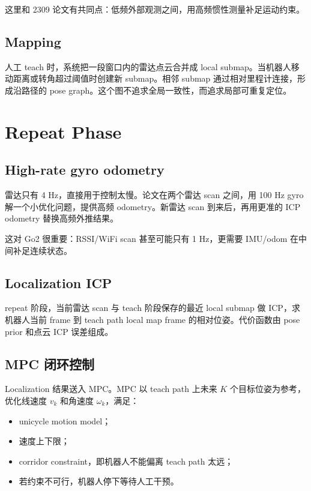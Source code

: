 \documentclass[UTF8,a4paper,12pt]{ctexrep}
\begin{document}
这里和 2309 论文有共同点：低频外部观测之间，用高频惯性测量补足运动约束。

\subsection{Mapping}

人工 teach 时，系统把一段窗口内的雷达点云合并成 local submap。当机器人移动距离或转角超过阈值时创建新 submap。相邻 submap 通过相对里程计连接，形成沿路径的 pose graph。这个图不追求全局一致性，而追求局部可重复定位。

\section{Repeat Phase}

\subsection{High-rate gyro odometry}

雷达只有 4 Hz，直接用于控制太慢。论文在两个雷达 scan 之间，用 100 Hz gyro 解一个小优化问题，提供高频 odometry。新雷达 scan 到来后，再用更准的 ICP odometry 替换高频外推结果。

这对 Go2 很重要：RSSI/WiFi scan 甚至可能只有 1 Hz，更需要 IMU/odom 在中间补足连续状态。

\subsection{Localization ICP}

repeat 阶段，当前雷达 scan 与 teach 阶段保存的最近 local submap 做 ICP，求机器人当前 frame 到 teach path local map frame 的相对位姿。代价函数由 pose prior 和点云 ICP 误差组成。

\subsection{MPC 闭环控制}

Localization 结果送入 MPC。MPC 以 teach path 上未来 \(K\) 个目标位姿为参考，优化线速度 \(v_k\) 和角速度 \(\omega_k\)，满足：

\begin{itemize}
  \item unicycle motion model；
  \item 速度上下限；
  \item corridor constraint，即机器人不能偏离 teach path 太远；
  \item 若约束不可行，机器人停下等待人工干预。
\end{itemize}
\end{document}
